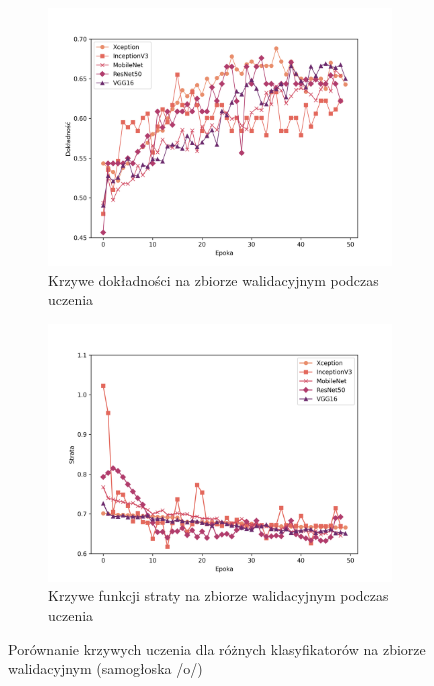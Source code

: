 \begin{figure}[ht]
    \centering
    \begin{subfigure}{0.49\textwidth}
        \centering
        \includegraphics[width=\textwidth]{./img/results/o_acc}
        \caption{Krzywe dokładności na zbiorze walidacyjnym podczas uczenia\@}
        \label{fig:o_acc}
    \end{subfigure}
    \begin{subfigure}{0.49\textwidth}
        \centering
        \includegraphics[width=\textwidth]{./img/results/o_loss}
        \caption{Krzywe funkcji straty na zbiorze walidacyjnym podczas uczenia\@}
        \label{fig:o_loss}
    \end{subfigure}

    \caption{Porównanie krzywych uczenia dla różnych klasyfikatorów na zbiorze walidacyjnym (samogłoska /o/)}
    \label{fig:o_results}
\end{figure}

